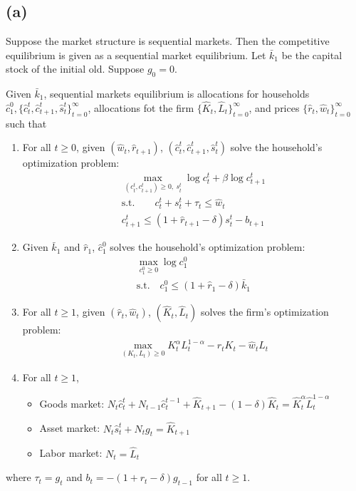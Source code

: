 \documentclass{ltjsarticle}
\begin{document}
\section{} %

\subsection*{(a)}

Suppose the market structure is sequential markets. Then the competitive equilibrium is given as a sequential market equilibrium.
Let $\bar{k}_1$ be the capital stock of the initial old. Suppose $g_0 = 0$.

Given $\bar{k}_1$, sequential markets equilibrium is allocations for households $\hat{c}_1^0, \{\hat{c}_t^t, \hat{c}_{t+1}^t, \hat{s}_t^t \}_{t=0}^{\infty}$, allocations fot the firm $\{\hat{K}_t, \hat{L}_t\}_{t=0}^{\infty}$, and prices $\{\hat{r}_t, \hat{w}_t\}_{t=0}^{\infty}$ such that
\begin{enumerate}
  \item For all $t \geq 0$, given $(\hat{w}_t, \hat{r}_{t+1})$, $(\hat{c}_t^t, \hat{c}_{t+1}^t, \hat{s}_t^t)$ solve the household's optimization problem:
  \begin{gather*}
    \max_{(c_t^t, c_{t+1}^t) \geq 0, \: s_t^t} \log c_t^t + \beta \log c_{t+1}^t \\
    \text{s.t.} \qquad c_t^t + s_t^t + \tau_t \leq \hat{w}_t \\
    c_{t+1}^t \leq (1 + \hat{r}_{t+1} - \delta) s_t^t - b_{t+1}
  \end{gather*}
  \item Given $\bar{k}_1$ and $\hat{r}_1$, $\hat{c}_1^0$ solves the household's optimization problem:
  \begin{gather*}
    \max_{c_1^0 \geq 0} \log c_1^0 \\
    \text{s.t.} \quad c_1^0 \leq (1 + \hat{r}_1 - \delta) \bar{k}_1
  \end{gather*}
  \item For all $t \geq 1$, given $(\hat{r}_t, \hat{w}_t)$, $(\hat{K}_t, \hat{L}_t)$ solves the firm's optimization problem:
  \begin{gather*}
    \max_{(K_t, L_t) \geq 0} K_t^\alpha L_t^{1-\alpha} - \hat{r}_t K_t - \hat{w}_t L_t
  \end{gather*}
  \item For all $t \geq 1$,
  \begin{itemize}
    \item Goods market: $N_t \hat{c}_t^t + N_{t-1} \hat{c}_t^{t-1} + \hat{K}_{t+1} - (1-\delta) \hat{K}_t  = \hat{K}_t^\alpha \hat{L}_t^{1-\alpha}$
    \item Asset market: $N_t \hat{s}_t^t + N_t g_t = \hat{K}_{t+1}$
    \item Labor market: $N_t = \hat{L}_t$
  \end{itemize}
\end{enumerate}
where $\tau_t = g_t$ and $b_t = -(1 + r_t - \delta) g_{t-1}$ for all $t \geq 1$.
\end{document}
